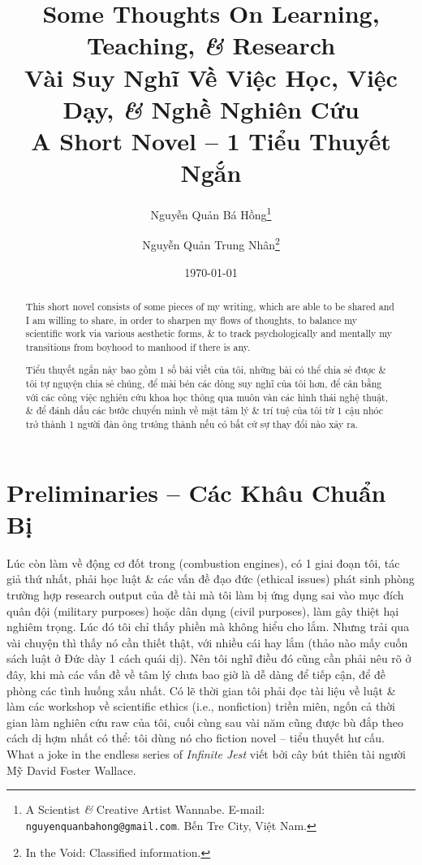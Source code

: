 \documentclass[12pt]{article}
\title{Some Thoughts On Learning, Teaching, {\it\&} Research\\Vài Suy Nghĩ Về Việc Học, Việc Dạy, {\it\&} Nghề Nghiên Cứu\\{\Large\sf A Short Novel -- 1 Tiểu Thuyết Ngắn}}
\author{Nguyễn Quản Bá Hồng\footnote{A Scientist {\it\&} Creative Artist Wannabe. E-mail: {\tt nguyenquanbahong@gmail.com}. Bến Tre City, Việt Nam.}\and Nguyễn Quản Trung Nhân\footnote{In the Void: Classified information.}}
\date{\today}
\begin{document}
\maketitle
\begin{abstract}
	This short novel consists of some pieces of my writing, which are able to be shared and I am willing to share, in order to sharpen my flows of thoughts, to balance my scientific work via various aesthetic forms, \& to track psychologically and mentally my transitions from boyhood to manhood if there is any.

	Tiểu thuyết ngắn này bao gồm 1 số bài viết của tôi, những bài có thể chia sẻ được \& tôi tự nguyện chia sẻ chúng, để mài bén các dòng suy nghĩ của tôi hơn, để cân bằng với các công việc nghiên cứu khoa học thông qua muôn vàn các hình thái nghệ thuật, \& để đánh dấu các bước chuyển mình về mặt tâm lý \& trí tuệ của tôi từ 1 cậu nhóc trở thành 1 người đàn ông trưởng thành nếu có bất cứ sự thay đổi nào xảy ra.
\end{abstract}
\setcounter{secnumdepth}{4}
\setcounter{tocdepth}{3}
\tableofcontents


\section{Preliminaries -- Các Khâu Chuẩn Bị}
Lúc còn làm về động cơ đốt trong (combustion engines), có 1 giai đoạn tôi, tác giả thứ nhất, phải học luật \& các vấn đề đạo đức (ethical issues) phát sinh phòng trường hợp research output của đề tài mà tôi làm bị ứng dụng sai vào mục đích quân đội (military purposes) hoặc dân dụng (civil purposes), làm gây thiệt hại nghiêm trọng. Lúc đó tôi chỉ thấy phiền mà không hiểu cho lắm. Nhưng trải qua vài chuyện thì thấy nó cần thiết thật, với nhiều cái hay lắm (thảo nào mấy cuốn sách luật ở Đức dày 1 cách quái dị). Nên tôi nghĩ điều đó cũng cần phải nêu rõ ở đây, khi mà các vấn đề về tâm lý chưa bao giờ là dễ dàng để tiếp cận, để đề phòng các tình huống xấu nhất. Có lẽ thời gian tôi phải đọc tài liệu về luật \& làm các workshop về scientific ethics (i.e., nonfiction) triền miên, ngốn cả thời gian làm nghiên cứu raw của tôi, cuối cùng sau vài năm cũng được bù đắp theo cách dị hợm nhất có thể: tôi dùng nó cho fiction novel -- tiểu thuyết hư cấu. What a joke in the endless series of {\it Infinite Jest} \cite{Wallace2011} viết bởi cây bút thiên tài người Mỹ {\sc David Foster Wallace}.
\end{document}
